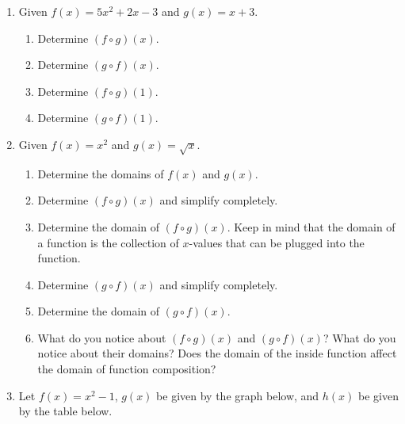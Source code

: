 \begin{enumerate}
\item Given $f(x)=5x^2+2x-3$ and $g(x)=x+3$.
\begin{enumerate}
\item Determine $(f \circ g)(x)$.
\vfill


\item  Determine $(g \circ f)(x)$.
\vfill
 
 \item Determine $(f \circ g)(1)$.
 \vfill
 
 \item  Determine $(g \circ f)(1)$.
 
 \vfill
 \end{enumerate}

\clearpage

\item Given $f(x)=x^2$ and $g(x)=\sqrt{x}$.
\begin{enumerate}
\item Determine the domains of $f(x)$ and $g(x)$.
  \vfill
\item Determine $(f \circ g)(x)$ and simplify completely.
  \vfill
\item Determine the domain of $(f \circ g)(x)$.  Keep in mind that the
  domain of a function is the collection of $x$-values that can be
  plugged into the function.
  \vfill
\item  Determine $(g \circ f)(x)$ and simplify completely.
  \vfill
\item Determine the domain of $(g \circ f)(x)$.
  \vfill
\item What do you notice about $(f \circ g)(x)$ and $(g \circ f)(x)$?
  What do you notice about their domains?  Does the domain of the
  inside function affect the domain of function composition?
  \vfill
\end{enumerate}




\vfill

\clearpage 

\item Let $f(x)=x^2-1$, $g(x)$ be given by the graph below, and $h(x)$ be given by the table below.



\end{enumerate}
